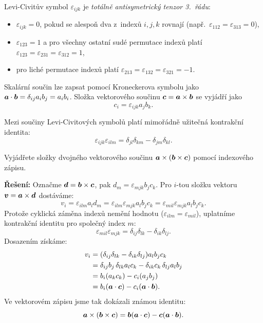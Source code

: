 Levi-Civitův symbol $\varepsilon_{ijk}$ je \emph{totálně antisymetrický tenzor 3.~řádu}:
\begin{itemize}
    \item $\varepsilon_{ijk} = 0$, pokud se alespoň dva z~indexů $i, j, k$ rovnají (např.~$\varepsilon_{112} = \varepsilon_{313} = 0$),
    \item $\varepsilon_{123} = 1$ a pro všechny ostatní sudé permutace indexů platí $\varepsilon_{123} = \varepsilon_{231} = \varepsilon_{312} = 1$,
    \item pro liché permutace indexů platí $\varepsilon_{213} = \varepsilon_{132} = \varepsilon_{321} = -1$.
\end{itemize}

Skalární součin lze zapsat pomocí Kroneckerova symbolu jako $\bm{a}\cdot\bm{b} = \delta_{ij} a_i b_j = a_i b_i$. Složka vektorového součinu $\bm{c} = \bm{a}\times\bm{b}$ se vyjádří jako
$$ c_i = \varepsilon_{ijk} a_j b_k. $$

Mezi součiny Levi-Civitových symbolů platí mimořádně užitečná kontrakční identita:
$$ \varepsilon_{ijk}\varepsilon_{ilm} = \delta_{jl}\delta_{km} - \delta_{jm}\delta_{kl}. $$

\begin{priklad}
    Vyjádřete složky dvojného vektorového součinu $\bm{a} \times (\bm{b}\times\bm{c})$ pomocí indexového zápisu.

    \textbf{Řešení:} Označme $\bm{d} = \bm{b} \times \bm{c}$, pak $d_m = \varepsilon_{mjk} b_j c_k$. Pro $i$-tou složku vektoru $\bm{v} = \bm{a} \times \bm{d}$ dostáváme:
    $$ v_i = \varepsilon_{ilm} a_l d_m = \varepsilon_{ilm} \varepsilon_{mjk} a_l b_j c_k = \varepsilon_{mil} \varepsilon_{mjk} a_l b_j c_k. $$
    Protože cyklická záměna indexů nemění hodnotu ($\varepsilon_{ilm} = \varepsilon_{mil}$), uplatníme kontrakční identitu pro společný index $m$:
    $$ \varepsilon_{mil}\varepsilon_{mjk} = \delta_{ij}\delta_{lk} - \delta_{ik}\delta_{lj}. $$
    Dosazením získáme:
    \begin{align*}
        v_i &= (\delta_{ij}\delta_{lk} - \delta_{ik}\delta_{lj}) a_l b_j c_k \\
            &= \delta_{ij} b_j \, \delta_{lk} a_l c_k - \delta_{ik} c_k \, \delta_{lj} a_l b_j \\
            &= b_i (a_k c_k) - c_i (a_j b_j) \\
            &= b_i (\bm{a}\cdot\bm{c}) - c_i (\bm{a}\cdot\bm{b}).
    \end{align*}
    Ve vektorovém zápisu jsme tak dokázali známou identitu:
    $$ \bm{a}\times(\bm{b}\times\bm{c}) = \bm{b}(\bm{a}\cdot\bm{c}) - \bm{c}(\bm{a}\cdot\bm{b}). $$
\end{priklad}

